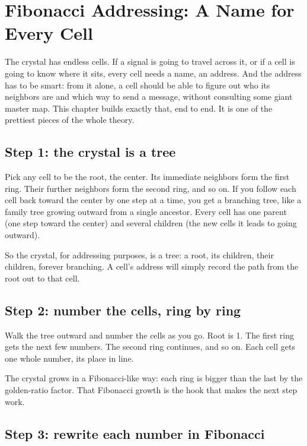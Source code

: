 \section{Fibonacci Addressing: A Name for Every Cell}

The crystal has endless cells. If a signal is going to travel across it, or if a cell is going to know where it sits, every cell needs a name, an address. And the address has to be smart: from it alone, a cell should be able to figure out who its neighbors are and which way to send a message, without consulting some giant master map. This chapter builds exactly that, end to end. It is one of the prettiest pieces of the whole theory.

\subsection{Step 1: the crystal is a tree}

Pick any cell to be the root, the center. Its immediate neighbors form the first ring. Their further neighbors form the second ring, and so on. If you follow each cell back toward the center by one step at a time, you get a branching tree, like a family tree growing outward from a single ancestor. Every cell has one parent (one step toward the center) and several children (the new cells it leads to going outward).

So the crystal, for addressing purposes, is a tree: a root, its children, their children, forever branching. A cell's address will simply record the path from the root out to that cell.

\subsection{Step 2: number the cells, ring by ring}

Walk the tree outward and number the cells as you go. Root is 1. The first ring gets the next few numbers. The second ring continues, and so on. Each cell gets one whole number, its place in line.

The crystal grows in a Fibonacci-like way: each ring is bigger than the last by the golden-ratio factor. That Fibonacci growth is the hook that makes the next step work.

\subsection{Step 3: rewrite each number in Fibonacci}


